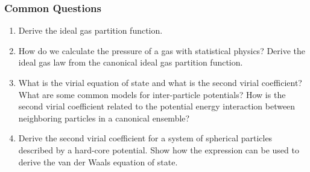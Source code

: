 \documentclass[11pt, a4paper]{article}
\begin{document}
\subsubsection{Common Questions}
\begin{enumerate}
    \item Derive the ideal gas partition function.

    \item How do we calculate the pressure of a gas with statistical physics? Derive the ideal gas law from the canonical ideal gas partition function.

    \item What is the virial equation of state and what is the second virial coefficient? What are some common models for inter-particle potentials? How is the second virial coefficient related to the potential energy interaction between neighboring particles in a canonical ensemble?

    \item Derive the second virial coefficient for a system of spherical particles described by a hard-core potential. Show how the expression can be used to derive the van der Waals equation of state.

\end{enumerate}
\end{document}

